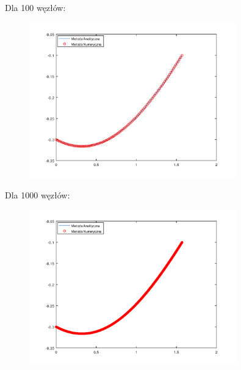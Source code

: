 \newpage
\begin{samepage}
    
    Dla 100 węzłów:
    \begin{figure}[!ht]
        \begin{center}
            \includegraphics[width=0.8\textwidth]{Lab4/charts/zad2/zad2_n_100.png}
        \end{center}
    \end{figure}
    \FloatBarrier
\end{samepage}


\begin{samepage}
    Dla 1000 węzłów:
    
    \begin{figure}[!ht]
        \begin{center}
            \includegraphics[width=0.8\textwidth]{Lab4/charts/zad2/zad2_n_1000.png}
        \end{center}
    \end{figure}
    \FloatBarrier
\end{samepage}    


